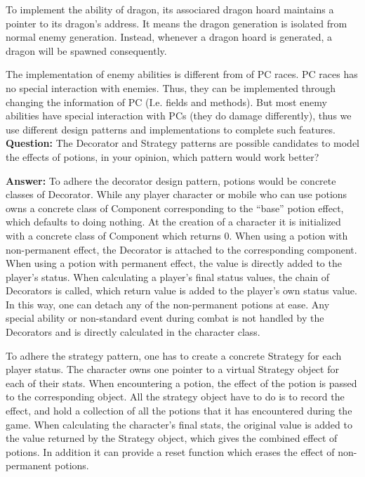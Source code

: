 \documentclass[11pt]{article}
\theoremstyle{plain} \newtheorem{theorem*}{Theorem}[subsection]
\begin{document}
To implement the ability of dragon, its associared dragon hoard maintains a
pointer to its dragon’s address. It means the dragon generation is isolated
from normal enemy generation. Instead, whenever a dragon hoard is generated, a
dragon will be spawned consequently.  

The implementation of enemy abilities is different from of PC races. PC races
has no special interaction with enemies. Thus, they can be implemented through
changing the information of PC (I.e. fields and methods). But most enemy
abilities have special interaction with PCs (they do damage differently), thus
we use different design patterns and implementations to complete such features. \\

\textbf{Question:}
The Decorator and Strategy patterns are possible candidates to model the
effects of potions, in your opinion, which pattern would work better? 

\textbf{Answer:}
To adhere the decorator design pattern, potions would be concrete classes of
Decorator. While any player character or mobile who can use potions owns a
concrete class of Component corresponding to the “base” potion effect, which
defaults to doing nothing. At the creation of a character it is initialized
with a concrete class of Component which returns 0. When using a potion with
non-permanent effect, the Decorator is attached to the corresponding component.
When using a potion with permanent effect, the value is directly added to the
player’s status. When calculating a player’s final status values, the chain of
Decorators is called, which return value is added to the player’s own status
value. In this way, one can detach any of the non-permanent potions at ease.
Any special ability or non-standard event during combat is not handled by the
Decorators and is directly calculated in the character class. 

To adhere the strategy pattern, one has to create a concrete Strategy for each
player status. The character owns one pointer to a virtual Strategy object for
each of their stats. When encountering a potion, the effect of the potion is
passed to the corresponding object. All the strategy object have to do is to
record the effect, and hold a collection of all the potions that it has
encountered during the game. When calculating the character’s final stats, the
original value is added to the value returned by the Strategy object, which
gives the combined effect of potions. In addition it can provide a reset
function which erases the effect of non-permanent potions.  
\end{document}
